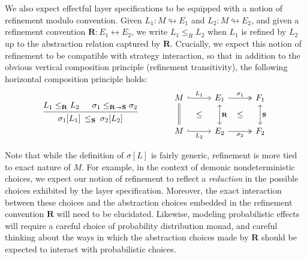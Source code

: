 We also expect effectful layer specifications
to be equipped with a notion of refinement modulo convention.
Given
$L_1 : M \looparrowright E_1$ and 
$L_2 : M \looparrowright E_2$,
and given a refinement convention
$\mathbf{R} : E_1 \leftrightarrow E_2$,
we write
$L_1 \le_R L_2$
when $L_1$ is refined by $L_2$
up to the abstraction relation captured by $\mathbf{R}$.
Crucially,
we expect this notion of refinement to be compatible with
strategy interaction,
so that in addition to the obvious vertical composition principle
(refinement transitivity),
the following horizontal composition principle holds:
\[
  \begin{prooftree}
    \hypo{L_1 \le_\mathbf{R} L_2}
    \hypo{\sigma_1 \le_{\mathbf{R} \twoheadrightarrow \mathbf{S}} \sigma_2}
    \infer2{\sigma_1[L_1] \: \le_\mathbf{S} \: \sigma_2[L_2]}
  \end{prooftree}
  \qquad
  \qquad
    \begin{tikzcd}[sep=tiny]
       M \ar[dd,equal] \ar[rr,hookrightarrow,"L_1"] &&
       E_1 \ar[dd,leftrightarrow,"\mathbf{R}"]
           \ar[rr,twoheadrightarrow,"\sigma_1"] &&
       F_1 \ar[dd,leftrightarrow,"\mathbf{S}"] \\
       & \le && \le & \\
       M \ar[rr,hookrightarrow,"L_2"'] &&
       E_2 \ar[rr,twoheadrightarrow,"\sigma_2"'] &&
       F_2
    \end{tikzcd}
\]

Note that while the definition of $\sigma[L]$ is fairly generic,
refinement is more tied to exact nature of $M$.
For example,
in the context of demonic nondeterministic choices,
we expect our notion of refinement to reflect
a \emph{reduction} in the possible choices
exhibited by the layer specification.
Moreover,
the exact interaction between these choices and
the abstraction choices embedded in the refinement convention $\mathbf{R}$
will need to be elucidated.
Likewise,
modeling probabilistic effects will require
a careful choice of probability distribution monad,
and careful thinking about the ways in which
the abstraction choices made by $\mathbf{R}$
should be expected to interact with probabilistic choices.

%

